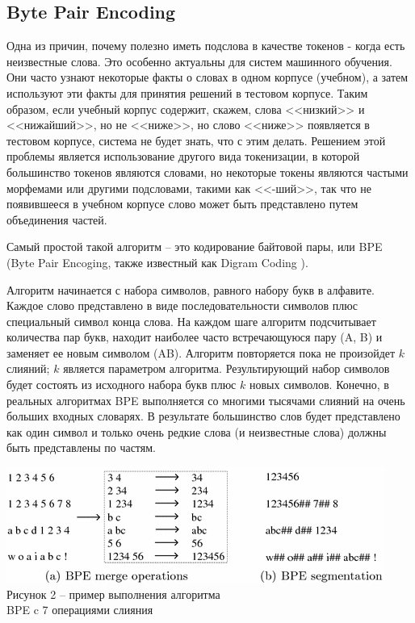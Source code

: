 \documentclass[a4paper,12pt,preview]{report} %
\begin{document}
	\subsection{Byte Pair Encoding}
	
	Одна из причин, почему полезно иметь подслова в качестве токенов - когда есть неизвестные слова.
	Это особенно актуальны для систем машинного обучения. Они часто узнают некоторые факты о словах
	в одном корпусе (учебном), а затем используют эти факты для принятия решений в тестовом корпусе. Таким образом, если учебный корпус содержит, скажем,
	слова <<низкий>> и <<нижайший>>, но не <<ниже>>, но слово <<ниже>> появляется в тестовом
	корпусе, система не будет знать, что с этим делать.
	Решением этой проблемы является использование другого вида токенизации, в которой большинство токенов
	являются словами, но некоторые токены являются частыми морфемами или другими подсловами, такими как <<-ший>>, так что не появившееся в учебном корпусе слово может быть представлено путем объединения частей.
	
	Самый простой такой алгоритм -- это кодирование байтовой пары, или BPE (Byte Pair Encoging, также известный как Digram Coding \cite{5}).
	
	Алгоритм начинается с набора символов, равного набору букв в алфавите. Каждое	слово представлено в виде последовательности символов плюс специальный символ конца слова. На каждом шаге алгоритм подсчитывает количества пар букв, находит
	наиболее часто встречающуюся пару (A, B) и заменяет ее новым символом (AB). Алгоритм повторяется пока не произойдет $k$ слияний; $k$ является параметром алгоритма. Результирующий набор символов
	будет состоять из исходного набора букв плюс $k$ новых символов.
	Конечно, в реальных алгоритмах BPE выполняется со многими тысячами слияний на очень больших входных словарях. В результате большинство слов будет представлено как один символ и только очень редкие слова (и неизвестные слова) должны быть представлены по частям.
	
	\begin{center}
		\includegraphics[scale=0.8]{bpe.png}
		\\ Рисунок 2 -- пример выполнения алгоритма \\ BPE c 7 операциями слияния
	\end{center}
	
\end{document}
